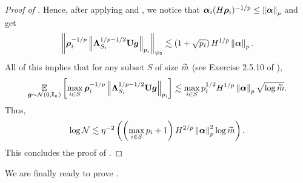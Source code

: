 \documentclass[11pt]{article}
\numberwithin{equation}{section}
\begin{document}
\begin{proof}[Proof of ]
Hence, after applying  and , we notice that $\bm{\alpha}_i(H\bm{\rho}_i)^{-1/p}\le\left\lVert \bm{\alpha} \right\rVert_p$ and get
\begin{align*}
    \left\lVert \bm{\rho}_i^{-1/p}\left\lVert \mathbf{\Lambda}^{1/p-1/2}_{S_i}\mathbf{U}\bm{g} \right\rVert_{p_i} \right\rVert_{\psi_2} \lesssim \left(1 + \sqrt{p_i}\right)H^{1/p}\left\lVert \bm{\alpha} \right\rVert_p.
\end{align*}
All of this implies that for any subset $S$ of size $\widetilde{m}$ (see Exercise 2.5.10 of \cite{vershynin_2018}),
\begin{align*}
    \underset{\bm{g}\sim\mathcal{N}(0,\mathbf{I}_n)}{\mathbb{E}}\left[\max_{i \in S} \bm{\rho}_i^{-1/p}\left\lVert \mathbf{\Lambda}^{1/p-1/2}_{S_i}\mathbf{U}\bm{g} \right\rVert_{p_i}\right] \lesssim \max_{i \in S} p_i^{1/2}H^{1/p}\left\lVert \bm{\alpha} \right\rVert_p\sqrt{\log\widetilde{m}}.
\end{align*}
Thus,
\begin{align*}
    \log\mathcal{N} \lesssim \eta^{-2}\left(\left(\max_{i \in S} p_i+1\right)H^{2/p}\left\lVert \bm{\alpha} \right\rVert_p^2\log\widetilde{m}\right).
\end{align*}
This concludes the proof of .
\end{proof}

We are finally ready to prove .
\end{document}
